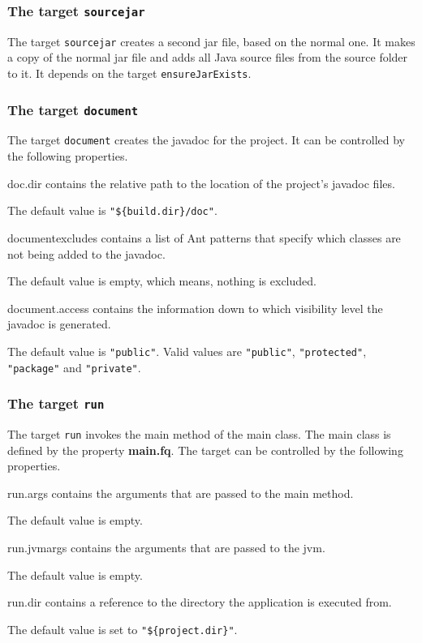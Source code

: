 \documentclass[a4paper,twoside,11pt,bibtotoc]{article}
\begin{document}
\subsubsection{The target \texttt{sourcejar}}
The target \texttt{sourcejar} creates a second jar file, based on the normal one.
It makes a copy of the normal jar file and adds all Java source files from the source folder to it.
It depends on the target \texttt{ensureJarExists}.

\subsubsection{The target \texttt{document}}
The target \texttt{document} creates the javadoc for the project.
It can be controlled by the following properties.
\begin{description*}
	\item[doc.dir] contains the relative path to the location of the project's javadoc files.\par The default value is \texttt{"\$\{build.dir\}/doc"}.
	\item[documentexcludes] contains a list of Ant patterns that specify which classes are not being added to the javadoc.\par The default value is empty, which means, nothing is excluded.
	\item[document.access] contains the information down to which visibility level the javadoc is generated.\par The default value is \texttt{"public"}. Valid values are \texttt{"public"}, \texttt{"protected"}, \texttt{"package"} and \texttt{"private"}.
\end{description*}


\subsubsection{The target \texttt{run}}
The target \texttt{run} invokes the main method of the main class.
The main class is defined by the property \textbf{main.fq}.
The target can be controlled by the following properties.

\begin{description*}
	\item[run.args] contains the arguments that are passed to the main method.\par The default value is empty.
	\item[run.jvmargs] contains the arguments that are passed to the jvm.\par The default value is empty.
	\item[run.dir] contains a reference to the directory the application is executed from.\par The default value is set to \texttt{"\$\{project.dir\}"}.
\end{description*}
\end{document}
